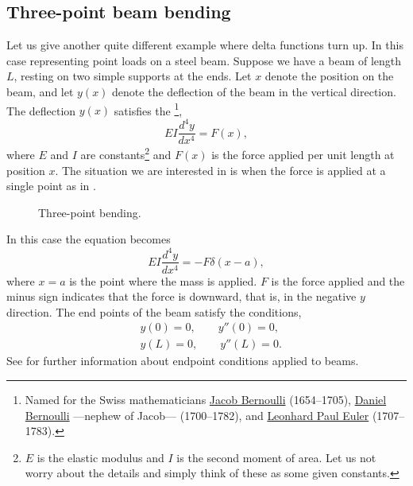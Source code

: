 \documentclass[12pt]{book}
\begin{document}
\subsection{Three-point beam bending}

Let us give another quite different
example where delta functions turn up.  In this case 
representing point loads on a steel beam.  Suppose we have a beam
of length $L$, resting on two simple supports at the ends.  Let $x$ denote
the position on the beam, and let $y(x)$ denote the deflection of the beam in
the vertical direction.  The deflection $y(x)$ satisfies the
\emph{}%
\footnote{Named for the Swiss mathematicians
\href{http://en.wikipedia.org/wiki/Jacob_Bernoulli}{Jacob Bernoulli}
(1654--1705),
\href{http://en.wikipedia.org/wiki/Daniel_Bernoulli}{Daniel Bernoulli}
---nephew of Jacob---
(1700--1782), and
\href{http://en.wikipedia.org/wiki/Euler}{Leonhard Paul Euler}
(1707--1783).},
\begin{equation*}
EI \frac{d^4 y}{dx^4} = F(x) ,
\end{equation*}
where $E$ and $I$ are constants\footnote{$E$ is the elastic modulus and $I$
is the second moment of area.  Let us not worry about the details and simply
think of these as some given constants.} and
$F(x)$ is the force applied per unit length at position $x$.  The situation
we are interested in is when the force is applied at a single point as in
.

\begin{figure}[h!t]
\capstart
\begin{center}
\caption{Three-point bending.\label{lt:beambendingfig}}
\end{center}
\end{figure}

In this case the equation becomes
\begin{equation*}
EI \frac{d^4 y}{dx^4} = -F \delta(x-a) ,
\end{equation*}
where $x=a$ is the point where the mass is applied.  $F$ is the force
applied and the minus sign indicates that the force is downward, that is, in the
negative $y$ direction.  The end points of the
beam satisfy the conditions,
\begin{align*}
& y(0) = 0, \qquad y''(0) = 0, \\
& y(L) = 0, \qquad y''(L) = 0.
\end{align*}
See  for further information about endpoint
conditions applied to beams.
\end{document}
